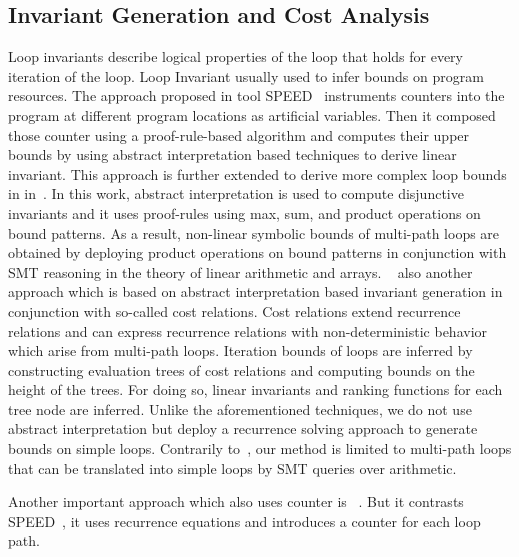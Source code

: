 \subsection{Invariant Generation and Cost Analysis} 
Loop invariants describe logical properties of the loop that holds for every iteration of the loop. Loop Invariant usually used to infer bounds on program resources.
The approach proposed in tool SPEED~\cite{speed1} instruments counters into the program at different program locations as artificial variables. Then it composed those counter using a proof-rule-based algorithm and computes their upper bounds by using abstract interpretation based techniques to derive linear invariant. This approach is further extended to derive more complex loop bounds in in~\cite{Gulwani:2010:RP:1806596.1806630}. In this work, 
abstract interpretation is used to compute disjunctive invariants and it uses proof-rules using max, sum, and product operations on bound patterns.
As a result, non-linear symbolic bounds of multi-path loops are obtained by deploying product operations on bound patterns in conjunction with SMT reasoning in the theory of linear arithmetic and arrays.  ~\cite{Albert:2011:CUB:1937961.1937986} also another approach which is based on abstract interpretation based invariant generation in conjunction with so-called cost relations. Cost relations extend recurrence relations and can express recurrence relations with non-deterministic behavior which arise from multi-path loops. Iteration bounds of loops are inferred by constructing evaluation trees of cost relations and computing bounds on the height of the trees. For doing so, linear invariants and ranking functions for each tree node are inferred. Unlike the aforementioned techniques, we do not use abstract interpretation but deploy a recurrence solving approach to generate bounds on simple loops. Contrarily to~\cite{speed1,Gulwani:2010:RP:1806596.1806630,Albert:2011:CUB:1937961.1937986}, our method is limited to multi-path loops that can be translated into simple loops by SMT queries over arithmetic.

Another important approach which also uses counter is ~\cite{Knoop:2011:SLB:2341512.2341532}. But it contrasts SPEED~\cite{speed1}, it uses recurrence equations and introduces a counter for each loop path. 

